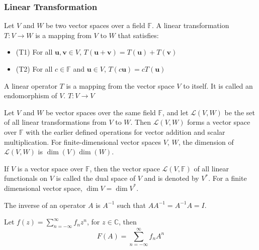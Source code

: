 \documentclass[a4paper]{article}
\begin{document}
\subsubsection*{Linear Transformation}
\begin{defi}
Let $V$ and $W$ be two vector spaces over a field $\mathbb{F}$. A linear transformation $T:V\rightarrow W$ is a mapping from $V$ to $W$ that satisfies:
\begin{itemize}
    \item (T1) For all $\mathbf{u},\mathbf{v}\in V$, $T(\mathbf{u}+\mathbf{v})=T(\mathbf{u})+T(\mathbf{v})$
    \item (T2) For all $c\in\mathbb{F}$ and $\mathbf{u}\in V$, $T(c\mathbf{u})=cT(\mathbf{u})$
\end{itemize}
\end{defi}
\begin{defi}
A linear operator $T$ is a mapping from the vector space $V$ to itself. It is called an endomorphism of $V$. $T:V\rightarrow V$
\end{defi}
\begin{defi}
Let $V$ and $W$ be vector spaces over the same field $\mathbb{F}$, and let $\mathcal{L}(V,W)$ be the set of all linear transformations from $V$ to $W$. Then $\mathcal{L}(V,W)$ forms a vector space over $\mathbb{F}$ with the earlier defined operations for vector addition and scalar multiplication. For finite-dimensional vector spaces $V$, $W$, the dimension of $\mathcal{L}(V,W)$ is $\dim(V)\dim(W)$.
\end{defi}
\begin{defi}
If $V$ is a vector space over $\mathbb{F}$, then the vector space $\mathcal{L}(V,\mathbb{F})$ of all linear functionals on $V$ is called the dual space of $V$ and is denoted by $V^*$. For a finite dimensional vector space, $\dim V=\dim V^*$.
\end{defi}
\begin{defi}[Inverse]
The inverse of an operator $A$ is $A^{-1}$ such that $AA^{-1}=A^{-1}A=I$.
\end{defi}
\begin{defi}
Let $f(z)=\sum_{n=-\infty}^\infty f_nz^n$, for $z\in\mathbb{C}$, then
$$F(A)=\sum_{n=-\infty}^\infty f_nA^n$$
\end{defi}
\end{document}
